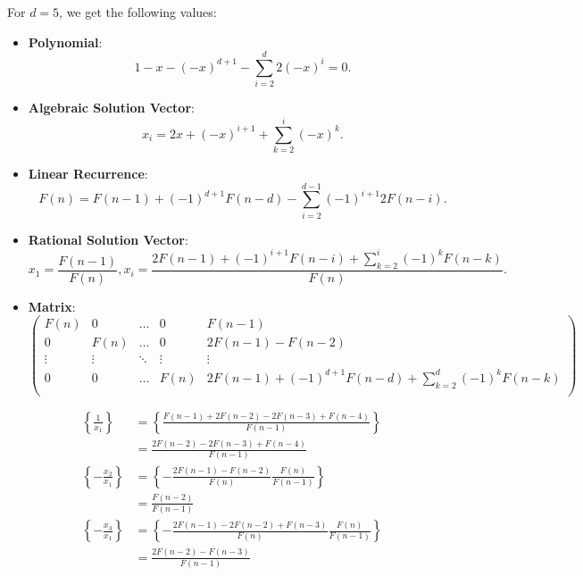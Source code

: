 \begin{example}
  For $d = 5$, we get the following values:

\end{example}

\begin{itemize}
  \item \textbf{Polynomial}:
    \[
      1 - x - (-x)^{d+1} - \sum_{i = 2}^{d} 2 (-x)^{i} = 0.
    \]
  \item \textbf{Algebraic Solution Vector}:
    \[
      x_i = 2x + (-x)^{i+1} + \sum_{k=2}^{i} (-x)^{k}.
    \]
  \item \textbf{Linear Recurrence}:
    \[
      F(n) = F(n - 1) + (-1)^{d+1} F(n - d) - \sum_{i=2}^{d - 1} (-1)^{i+1} 2 F(n - i).
    \]
  \item \textbf{Rational Solution Vector}:
    \[
      x_1 = \frac{F(n - 1)}{F(n)}, x_i = \frac{2 F(n-1) + (-1)^{i+1} F(n - i) + \sum_{k=2}^i (-1)^k F(n-k)}{F(n)}.
    \]
  \item \textbf{Matrix}:
    \[\left(\begin{array}{cccc|c}
      F(n)   & 0      & \dots  & 0      & F(n - 1) \\
        0    & F(n)   & \dots  & 0      & 2 F(n - 1) - F(n - 2) \\
      \vdots & \vdots & \ddots & \vdots & \vdots   \\
        0    & 0      & \dots  & F(n)   & 2 F(n-1) + (-1)^{d+1} F(n - d) + \sum_{k=2}^d (-1)^k F(n-k) \\
    \end{array}\right)\]
\end{itemize}

\begin{example}
  \begin{align*}
    \left\{ \frac{1}{x_1} \right\}
    & = \left\{ \frac{F(n - 1) + 2 F(n - 2) - 2 F(n - 3) + F(n - 4)}{F(n - 1)} \right\} \\
    & = \frac{2 F(n - 2) - 2 F(n - 3) + F(n - 4)}{F(n - 1)} \\
    \left\{ -\frac{x_2}{x_1} \right\}
    & = \left\{ -\frac{2 F(n - 1) - F(n - 2)}{F(n)} \frac{F(n)}{F(n - 1)} \right\} \\
    & = \frac{F(n - 2)}{F(n - 1)} \\
    \left\{ -\frac{x_3}{x_1} \right\}
    & = \left\{ -\frac{2 F(n - 1) - 2 F(n - 2) + F(n - 3)}{F(n)} \frac{F(n)}{F(n - 1)} \right\} \\
    & = \frac{2 F(n - 2) - F(n - 3)}{F(n - 1)}
  \end{align*}
\end{example}

